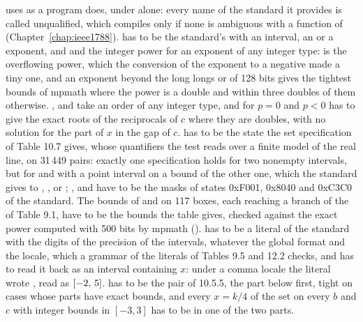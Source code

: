 \documentclass[12pt,a4paper,twoside,openright]{book}
\begin{document}
\medskip
{} uses  as a program does, under
 alone: every name of the standard it
provides is called unqualified, which compiles only if none is ambiguous
with a function of  (Chapter~\ref{chap:ieee1788}).
 has to be the standard's with an interval, an  or a
 exponent, and  and  the integer
power for an exponent of any integer type:\newinvfive{}
 is the overflowing power, which the
conversion of the exponent to a negative  made a tiny one, and an
exponent beyond the long longs or of 128 bits gives the tightest bounds of
mpmath where the power is a double and within three doubles of them
otherwise. ,  and 
take an order of any integer type, and  for $p=0$ and
$p<0$ has to give the exact roots of the reciprocals of $c$ where they are
doubles, with no solution for the part of $x$ in the gap of $c$.
\newinvfive{} has to be the state the set specification
of Table 10.7 gives, whose quantifiers the test reads over a finite model of
the real line, on 31\,449 pairs: exactly one specification holds for two
nonempty intervals, but for  and  with a point
interval on a bound of the other one, which the standard gives to
, ,  or ;
,  and  have to be the masks of
states 0xF001, 0x8040 and 0xC3C0 of the standard. The bounds of
 and  on 117 boxes, each reaching
a branch of the  of Table 9.1, have to be the bounds the table
gives, checked against the exact power computed with 500 bits by mpmath
().  has to be a
literal of the standard with the digits of the precision of the intervals,
whatever the global format and the locale, which a grammar of the literals
of Tables 9.5 and 12.2 checks, and  has to read it back
as an interval containing $x$: under a comma locale the literal
\code{[a]} wrote \code{[-2,5]}, read as $[-2,\,5]$.\newinvfive{}
 has to be the pair of 10.5.5, the part below
first, tight on cases whose parts have exact bounds, and every $x=k/4$ of
the set on every $b$ and $c$ with integer bounds in $[-3, 3]$ has to be in
one of the two parts.\newinvfive
\end{document}
